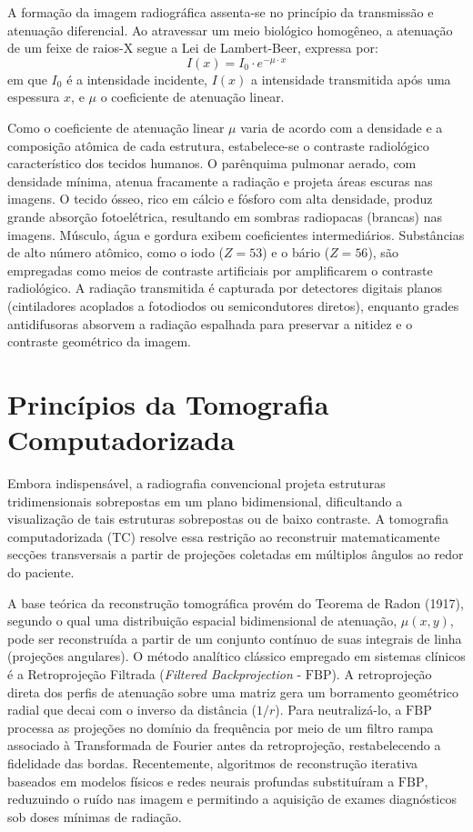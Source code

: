 \documentclass[a4paper,12pt,oneside,openright]{abntex2}
\begin{document}
A formação da imagem radiográfica assenta-se no princípio da transmissão e atenuação diferencial. Ao atravessar um meio biológico homogêneo, a atenuação de um feixe de raios-X segue a Lei de Lambert-Beer, expressa por:
\begin{equation}
I(x) = I_0 \cdot e^{-\mu \cdot x}
\end{equation}
em que $I_0$ é a intensidade incidente, $I(x)$ a intensidade transmitida após uma espessura $x$, e $\mu$ o coeficiente de atenuação linear. 

Como o coeficiente de atenuação linear $\mu$ varia de acordo com a densidade e a composição atômica de cada estrutura, estabelece-se o contraste radiológico característico dos tecidos humanos. O parênquima pulmonar aerado, com densidade mínima, atenua fracamente a radiação e projeta áreas escuras nas imagens. O tecido ósseo, rico em cálcio e fósforo com alta densidade, produz grande absorção fotoelétrica, resultando em sombras radiopacas (brancas) nas imagens. Músculo, água e gordura exibem coeficientes intermediários. Substâncias de alto número atômico, como o iodo ($Z = 53$) e o bário ($Z = 56$), são empregadas como meios de contraste artificiais por amplificarem o contraste radiológico. A radiação transmitida é capturada por detectores digitais planos (cintiladores acoplados a fotodiodos ou semicondutores diretos), enquanto grades antidifusoras absorvem a radiação espalhada para preservar a nitidez e o contraste geométrico da imagem.

\section{Princípios da Tomografia Computadorizada}

Embora indispensável, a radiografia convencional projeta estruturas tridimensionais sobrepostas em um plano bidimensional, dificultando a visualização de tais estruturas sobrepostas ou de baixo contraste. A tomografia computadorizada (TC) resolve essa restrição ao reconstruir matematicamente secções transversais a partir de projeções coletadas em múltiplos ângulos ao redor do paciente.

A base teórica da reconstrução tomográfica provém do Teorema de Radon (1917), segundo o qual uma distribuição espacial bidimensional de atenuação, $\mu(x, y)$, pode ser reconstruída a partir de um conjunto contínuo de suas integrais de linha (projeções angulares). O método analítico clássico empregado em sistemas clínicos é a Retroprojeção Filtrada (\textit{Filtered Backprojection} - $\text{FBP}$). A retroprojeção direta dos perfis de atenuação sobre uma matriz gera um borramento geométrico radial que decai com o inverso da distância ($1/r$). Para neutralizá-lo, a $\text{FBP}$ processa as projeções no domínio da frequência por meio de um filtro rampa associado à Transformada de Fourier antes da retroprojeção, restabelecendo a fidelidade das bordas. Recentemente, algoritmos de reconstrução iterativa baseados em modelos físicos e redes neurais profundas substituíram a $\text{FBP}$, reduzuindo o ruído nas imagem e permitindo a aquisição de exames diagnósticos sob doses mínimas de radiação.
\end{document}
